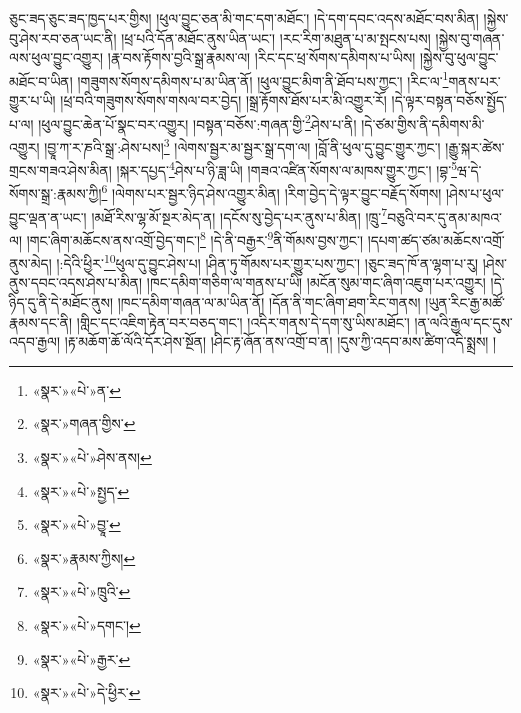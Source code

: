ཅུང་ཟད་ཅུང་ཟད་ཁྱད་པར་གྱིས། །ཕུལ་བྱུང་ཅན་མི་གང་དག་མཐོང་། །དེ་དག་དབང་འདས་མཐོང་བས་མིན། །སྐྱེས་བུ་ཤེས་རབ་ཅན་ཡང་ནི། །ཕྲ་པའི་དོན་མཐོང་ནུས་ཡིན་ཡང་། །རང་རིག་མཐུན་པ་མ་སྤངས་པས། །སྐྱེས་བུ་གཞན་ལས་ཕུལ་བྱུང་འགྱུར། །རྣ་བས་རྟོགས་བྱའི་སྒྲ་རྣམས་ལ། །རིང་དང་ཕྲ་སོགས་དམིགས་པ་ཡིས། །སྐྱེས་བུ་ཕུལ་བྱུང་མཐོང་བ་ཡིན། །གཟུགས་སོགས་དམིགས་པ་མ་ཡིན་ནོ། །ཕུལ་བྱུང་མིག་ནི་ཐོབ་པས་ཀྱང་། །རིང་ལ་\footnote{«སྣར་»«པེ་»ན་}གནས་པར་གྱུར་པ་ཡི། །ཕྲ་བའི་གཟུགས་སོགས་གསལ་བར་བྱེད། །སྒྲ་རྟོགས་ཐོས་པར་མི་འགྱུར་རོ། །དེ་ལྟར་བསྟན་བཅོས་སྤྱོད་པ་ལ། །ཕུལ་བྱུང་ཆེན་པོ་སྣང་བར་འགྱུར། །བསྟན་བཅོས་:གཞན་གྱི་\footnote{«སྣར་»གཞན་གྱིས་}ཤེས་པ་ནི། །དེ་ཙམ་གྱིས་ནི་དམིགས་མི་འགྱུར། །བྱཱ་ཀ་ར་ཎའི་སྒྲ་:ཤེས་པས།\footnote{«སྣར་»«པེ་»ཤེས་ནས།} །ལེགས་སྦྱར་མ་སྦྱར་སྒྲ་དག་ལ། །བློ་ནི་ཕུལ་དུ་བྱུང་གྱུར་ཀྱང་། །རྒྱུ་སྐར་ཚེས་གྲངས་གཟའ་ཤེས་མིན། །སྐར་དཔྱད་\footnote{«སྣར་»«པེ་»སྤྱད་}ཤེས་པ་ཉི་ཟླ་ཡི། །གཟའ་འཛིན་སོགས་ལ་མཁས་གྱུར་ཀྱང་། །བྷ་\footnote{«སྣར་»«པེ་»བྱཱ་}ཝ་དེ་སོགས་སྒྲ་:རྣམས་ཀྱི།\footnote{«སྣར་»རྣམས་ཀྱིས།} །ལེགས་པར་སྦྱར་ཉིད་ཤེས་འགྱུར་མིན། །རིག་བྱེད་དེ་ལྟར་བྱུང་བརྗོད་སོགས། །ཤེས་པ་ཕུལ་བྱུང་ལྡན་ན་ཡང་། །མཐོ་རིས་ལྷ་མོ་སྔར་མེད་ན། །དངོས་སུ་བྱེད་པར་ནུས་པ་མིན། །ཁྲུ་\footnote{«སྣར་»«པེ་»ཁྲུའི་}བཅུའི་བར་དུ་ནམ་མཁའ་ལ། །གང་ཞིག་མཆོངས་ནས་འགྲོ་བྱེད་གང་།\footnote{«སྣར་»«པེ་»དགང་།} །དེ་ནི་བརྒྱར་\footnote{«སྣར་»«པེ་»རྒྱར་}ནི་གོམས་བྱས་ཀྱང་། །དཔག་ཚད་ཙམ་མཆོངས་འགྲོ་ནུས་མེད། །:དེའི་ཕྱིར་\footnote{«སྣར་»«པེ་»དེ་ཕྱིར་}ཕུལ་དུ་བྱུང་ཤེས་པ། །ཤིན་ཏུ་གོམས་པར་གྱུར་པས་ཀྱང་། །ཅུང་ཟད་ཁོ་ན་ལྷག་པ་རུ། །ཤེས་ནུས་དབང་འདས་ཤེས་པ་མིན། །ཁང་དམིག་གཅིག་ལ་གནས་པ་ཡི། །མངོན་སུམ་གང་ཞིག་འཇུག་པར་འགྱུར། །དེ་ཉིད་དུ་ནི་དེ་མཐོང་ནུས། །ཁང་དམིག་གཞན་ལ་མ་ཡིན་ནོ། །དོན་ནི་གང་ཞིག་ཐག་རིང་གནས། །ཡུན་རིང་རྒྱ་མཚོ་རྣམས་དང་ནི། །གླིང་དང་འཇིག་རྟེན་བར་བཅད་གང་། །འདིར་གནས་དེ་དག་སུ་ཡིས་མཐོང་། །ན་ལའི་རྒྱལ་དང་དུས་འདབ་རྒྱལ། །རྟ་མཆོག་ཆོ་ལོའི་དོར་ཤེས་སྔོན། །ཤིང་རྟ་ཞོན་ནས་འགྲོ་བ་ན། །དུས་ཀྱི་འདབ་མས་ཚིག་འདི་སྨྲས། །
